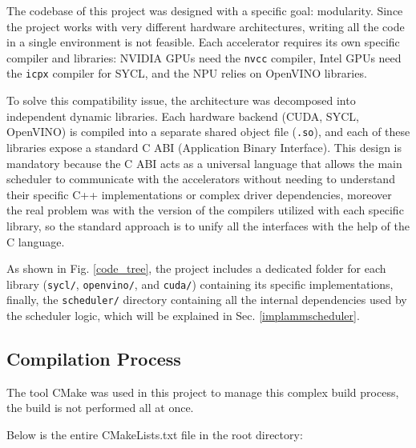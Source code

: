\clearpage 

The codebase of this project was designed with a specific goal: modularity. Since the project works with very different hardware architectures, writing all the code in a single environment is not feasible. Each accelerator requires its own specific compiler and libraries: NVIDIA GPUs need the \texttt{nvcc} compiler, Intel GPUs need the \texttt{icpx} compiler for SYCL, and the NPU relies on OpenVINO libraries.

To solve this compatibility issue, the architecture was decomposed into independent dynamic libraries. Each hardware backend (CUDA, SYCL, OpenVINO) is compiled into a separate shared object file (\texttt{.so}), and each of these libraries expose a standard C ABI (Application Binary Interface). This design is mandatory because the C ABI acts as a universal language that allows the main scheduler to communicate with the accelerators without needing to understand their specific C++ implementations or complex driver dependencies, moreover the real problem was with the version of the compilers utilized with each specific library, so the standard approach is to unify all the interfaces with the help of the C language.

As shown in Fig. \ref{code_tree}, the project includes a dedicated folder for each library (\texttt{sycl/}, \texttt{openvino/}, and \texttt{cuda/}) containing its specific implementations, finally, the \texttt{scheduler/} directory containing all the internal dependencies used by the scheduler logic, which will be explained in Sec. \ref{implammscheduler}.

\subsection{Compilation Process}
The tool CMake was used in this project to manage this complex build process, the build is not performed all at once. 

Below is the entire CMakeLists.txt file in the root directory:


